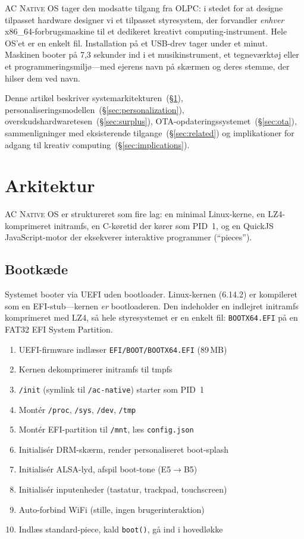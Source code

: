 \documentclass[10pt,letterpaper,twocolumn]{article}
\newcommand{\acos}{\textsc{AC Native OS}}
\begin{document}
\acos{} tager den modsatte tilgang fra OLPC: i stedet for at designe tilpasset hardware designer vi et tilpasset styresystem, der forvandler \emph{enhver} x86\_64-forbrugsmaskine til et dedikeret kreativt computing-instrument. Hele OS'et er en enkelt fil. Installation på et USB-drev tager under et minut. Maskinen booter på 7,3 sekunder ind i et musikinstrument, et tegneværktøj eller et programmeringsmiljø---med ejerens navn på skærmen og deres stemme, der hilser dem ved navn.

Denne artikel beskriver systemarkitekturen~(\S\ref{sec:architecture}), personaliseringsmodellen~(\S\ref{sec:personalization}), overskudshardwaretesen~(\S\ref{sec:surplus}), OTA-opdateringssystemet~(\S\ref{sec:ota}), sammenligninger med eksisterende tilgange~(\S\ref{sec:related}) og implikationer for adgang til kreativ computing~(\S\ref{sec:implications}).

\section{Arkitektur}
\label{sec:architecture}

\acos{} er struktureret som fire lag: en minimal Linux-kerne, en LZ4-komprimeret initramfs, en C-køretid der kører som PID~1, og en QuickJS JavaScript-motor der eksekverer interaktive programmer (``pieces'').

\subsection{Bootkæde}

Systemet booter via UEFI uden bootloader. Linux-kernen (6.14.2) er kompileret som en EFI-stub---kernen \emph{er} bootloaderen. Den indeholder en indlejret initramfs komprimeret med LZ4, så hele styresystemet er en enkelt fil: \texttt{BOOTX64.EFI} på en FAT32 EFI System Partition.

\begin{enumerate}
  \item UEFI-firmware indlæser \texttt{EFI/BOOT/BOOTX64.EFI} (89\,MB)
  \item Kernen dekomprimerer initramfs til tmpfs
  \item \texttt{/init} (symlink til \texttt{/ac-native}) starter som PID~1
  \item Montér \texttt{/proc}, \texttt{/sys}, \texttt{/dev}, \texttt{/tmp}
  \item Montér EFI-partition til \texttt{/mnt}, læs \texttt{config.json}
  \item Initialisér DRM-skærm, render personaliseret boot-splash
  \item Initialisér ALSA-lyd, afspil boot-tone (E5$\rightarrow$B5)
  \item Initialisér inputenheder (tastatur, trackpad, touchscreen)
  \item Auto-forbind WiFi (stille, ingen brugerinteraktion)
  \item Indlæs standard-piece, kald \texttt{boot()}, gå ind i hovedløkke
\end{enumerate}
\end{document}
